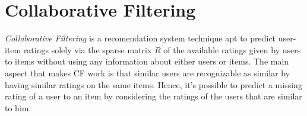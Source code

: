 \section{Collaborative Filtering}

\emph{Collaborative Filtering}\cite{Bobadilla2013} is a recomendation system 
technique apt to predict user-item ratings solely via the sparse 
matrix $\mathit{R}$ of the available ratings given by users to items
without using any information about either users or items.
The main aspect that makes CF work is that similar users are recognizable as similar
by having similar ratings on the same items.
Hence, it's possible to predict a missing rating of a user to an item
by considering the ratings of the users that are similar to him.

